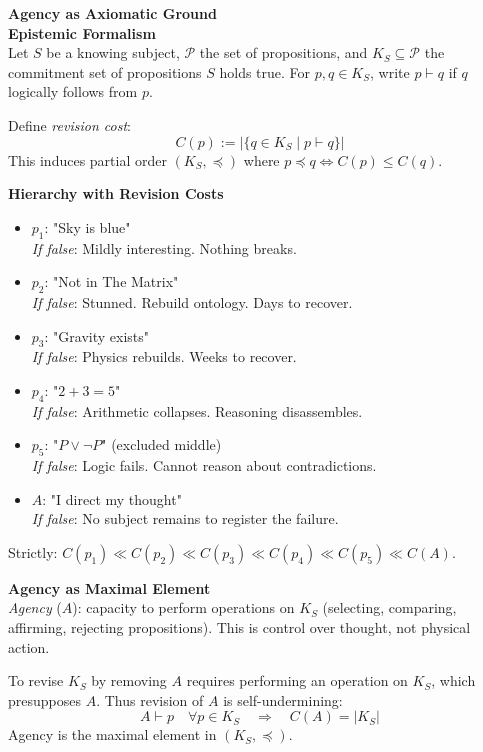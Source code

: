 \begin{technical}
{\Large\textbf{Agency as Axiomatic Ground}}\\[0.2em]

\textbf{Epistemic Formalism}\\[0.1em]
Let $S$ be a knowing subject, $\mathcal{P}$ the set of propositions, and $K_S \subseteq \mathcal{P}$ the commitment set of propositions $S$ holds true. For $p, q \in K_S$, write $p \vdash q$ if $q$ logically follows from $p$.

Define \textit{revision cost}:
\[
C(p) := |\{q \in K_S \mid p \vdash q\}|
\]
This induces partial order $(K_S, \preceq)$ where $p \preceq q \iff C(p) \leq C(q)$.

\textbf{Hierarchy with Revision Costs}\\[0.1em]
\begin{itemize}[leftmargin=*,topsep=0pt,itemsep=1pt]
    \item $p_1$: "Sky is blue"\\
    \textit{If false}: Mildly interesting. Nothing breaks.
    \item $p_2$: "Not in The Matrix"\\
    \textit{If false}: Stunned. Rebuild ontology. Days to recover.
    \item $p_3$: "Gravity exists"\\
    \textit{If false}: Physics rebuilds. Weeks to recover.
    \item $p_4$: "$2+3=5$"\\
    \textit{If false}: Arithmetic collapses. Reasoning disassembles.
    \item $p_5$: "$P \vee \neg P$" (excluded middle)\\
    \textit{If false}: Logic fails. Cannot reason about contradictions.
    \item $A$: "I direct my thought"\\
    \textit{If false}: No subject remains to register the failure.
\end{itemize}
Strictly: $C(p_1) \ll C(p_2) \ll C(p_3) \ll C(p_4) \ll C(p_5) \ll C(A)$.

\textbf{Agency as Maximal Element}\\[0.1em]
\textit{Agency} ($A$): capacity to perform operations on $K_S$ (selecting, comparing, affirming, rejecting propositions). This is control over thought, not physical action.

To revise $K_S$ by removing $A$ requires performing an operation on $K_S$, which presupposes $A$. Thus revision of $A$ is self-undermining:
\[
A \vdash p \quad \forall p \in K_S \quad \Rightarrow \quad C(A) = |K_S|
\]
Agency is the maximal element in $(K_S, \preceq)$.


\end{technical}
